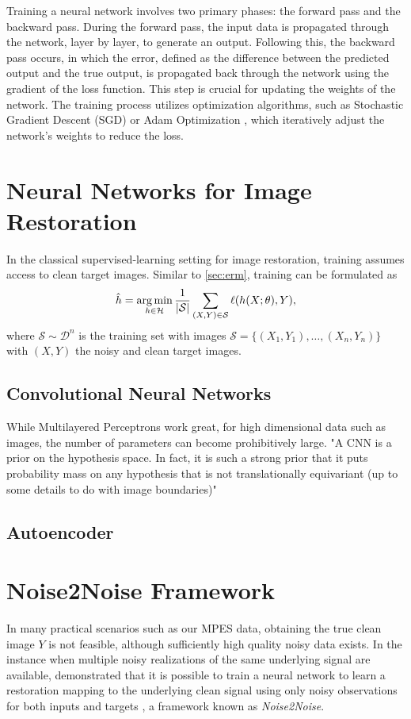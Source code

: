 Training a neural network involves two primary phases: the forward pass and the backward pass. During the forward pass, the input data is propagated through the network, layer by layer, to generate an output. Following this, the backward pass occurs, in which the error, defined as the difference between the predicted output and the true output, is propagated back through the network using the gradient of the loss function. This step is crucial for updating the weights of the network.
The training process utilizes optimization algorithms, such as Stochastic Gradient Descent (SGD) \cite{sutskeverImportanceInitializationMomentum2013} or Adam Optimization \cite{kingmaAdamMethodStochastic2017}, which iteratively adjust the network's weights to reduce the loss.

\section{Neural Networks for Image Restoration}
In the classical supervised-learning setting for image restoration, training assumes access to clean target images. Similar to \cref{sec:erm}, training can be formulated as
\begin{equation}
    \hat{h} = \operatorname*{arg\,min}_{h \in \mathcal{H}} \frac{1}{\lvert \mathcal{S} \rvert} \sum_{(X, Y) \in \mathcal{S}} \ell(h(X; \theta), Y),
\end{equation}
where $\mathcal{S} \sim \mathcal{D}^n$ is the training set with images $\mathcal{S} = \{(X_1, Y_1), \dots, (X_n, Y_n)\}$ with $(X, Y)$  the noisy and clean target images.

\subsection{Convolutional Neural Networks}
While Multilayered Perceptrons work great, for high dimensional data such as images, the number of parameters can become prohibitively large. 
"A CNN is a prior on the hypothesis space. In fact, it is such a strong prior that it puts 
 probability mass on any hypothesis that is not translationally equivariant (up to some details to do with image boundaries)"

\subsection{Autoencoder}
\cite{goodfellowDeepLearning2016}


\section{Noise2Noise Framework}
In many practical scenarios such as our \gls{MPES} data, obtaining the true clean image $Y$ is not feasible, although sufficiently high quality noisy data exists. In the instance when multiple noisy realizations of the same underlying signal are available, \citeauthor{lehtinenNoise2NoiseLearningImage2018} demonstrated that it is possible to train a neural network to learn a restoration mapping to the underlying clean signal using only noisy observations for both inputs and targets \cite{lehtinenNoise2NoiseLearningImage2018}, a framework known as \textit{Noise2Noise}. 

